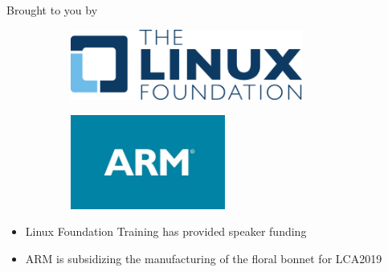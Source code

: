 \begin{frame}
   {Brought to you by}
   \begin{figure}[H]
      \centering
      \begin{subfigure}{0.4\textwidth}
         \centering
         \includegraphics[width=3in]{IMAGES/LF-logo}
      \end{subfigure}
      \begin{subfigure}{0.4\textwidth}
         \centering
         \includegraphics[width=2in]{IMAGES/ARM-logo}
      \end{subfigure}
   \end{figure}
   \begin{itemize}
      \item Linux Foundation Training has provided speaker funding
      \item ARM is subsidizing the manufacturing of the floral bonnet for LCA2019
   \end{itemize}
\end{frame}

\cprotect{}

